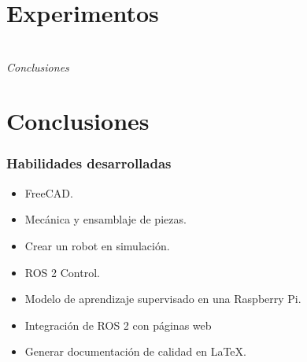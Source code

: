 \documentclass{beamer}
\begin{document}
\section{Experimentos}
\begin{frame}
\end{frame}

\begin{frame}
\end{frame}

\section*{}
\begin{frame}{}
  \centering \Huge
  \emph{Conclusiones}
\end{frame}

\section{Conclusiones}
\begin{frame}
\frametitle{Habilidades desarrolladas}
\begin{itemize}
\item FreeCAD.
\item Mecánica y ensamblaje de piezas.
\item Crear un robot en simulación.
\item ROS 2 Control.
\item Modelo de aprendizaje supervisado en una Raspberry Pi.
\item Integración de ROS 2 con páginas web
\item Generar documentación de calidad en LaTeX.
\end{itemize}
\end{frame}
	
\end{document}
